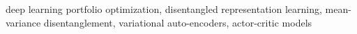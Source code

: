 \documentclass[preprint,review,12pt]{elsarticle}
\begin{document}
\begin{frontmatter}
\begin{keyword}
	deep learning portfolio optimization\sep
	disentangled representation learning\sep
	mean-variance disentanglement\sep
	variational auto-encoders\sep
	actor-critic models
\end{keyword}

\end{frontmatter}

\linenumbers

%
%
%
\end{document}
